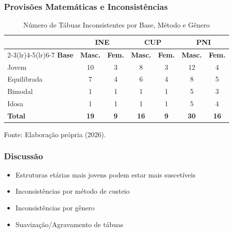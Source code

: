 \documentclass[11pt]{beamer}
\newcommand{\fonte}[1]{%
    \par
    \raggedright
    {Fonte: #1}
}
\begin{document}
    \begin{frame}

        \frametitle{Provisões Matemáticas e Inconsistências}

            \begin{table}[H]
                \centering
                \caption{Número de Tábuas Inconsistentes por Base, Método e Gênero}
                \renewcommand{\arraystretch}{1.1}
                \begin{tabular}{lcccccc}
                \toprule
                & \multicolumn{2}{c}{\textbf{INE}} & \multicolumn{2}{c}{\textbf{CUP}} & \multicolumn{2}{c}{\textbf{PNI}} \\
                \cmidrule(lr){2-3}\cmidrule(lr){4-5}\cmidrule(lr){6-7}
                \textbf{Base} & \textbf{Masc.} & \textbf{Fem.} & \textbf{Masc.} & \textbf{Fem.} & \textbf{Masc.} & \textbf{Fem.} \\
                \midrule
                Jovem       & 10 & 3 & 8 & 3 & 12 & 4 \\
                Equilibrada &  7 & 4 & 6 & 4 &  8 & 5 \\
                Bimodal     &  1 & 1 & 1 & 1 &  5 & 3 \\
                Idosa       &  1 & 1 & 1 & 1 &  5 & 4 \\
                \midrule
                \textbf{Total} & \textbf{19} & \textbf{9} & \textbf{16} & \textbf{9} & \textbf{30} & \textbf{16} \\
                \bottomrule
                \end{tabular}
                \label{tab:sintese_inconsistencias}
                \vspace{0.25cm}
                \fonte{Elaboração própria (2026).}
            \end{table}

    \end{frame}

    \begin{frame}

        \frametitle{Discussão}

            \begin{itemize}
                \item Estruturas etárias mais jovens podem estar mais suscetíveis
                \medskip
                \item Inconsistências por método de custeio
                \medskip
                \item Inconsistências por gênero
                \medskip
                \item Suavização/Agravamento de tábuas
            \end{itemize}

    \end{frame}
\end{document}
